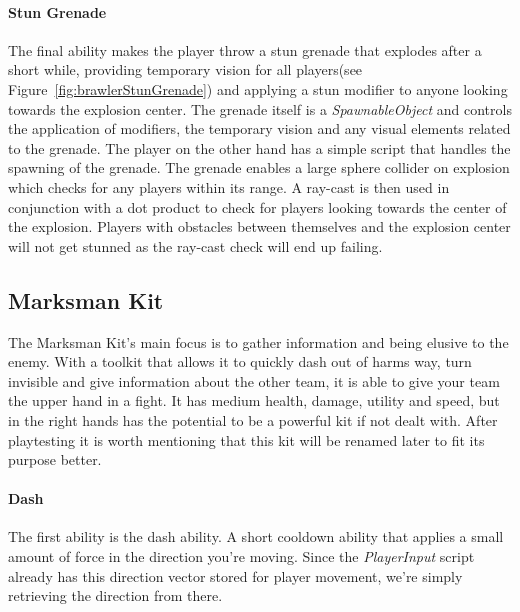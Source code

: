 \paragraph{Stun Grenade}
The final ability makes the player throw a stun grenade that explodes after a short while, providing temporary vision for all players(see Figure~\ref{fig:brawlerStunGrenade}) and applying a stun modifier to anyone looking towards the explosion center. The grenade itself is a \emph{SpawnableObject} and controls the application of modifiers, the temporary vision and any visual elements related to the grenade. The player on the other hand has a simple script that handles the spawning of the grenade. The grenade enables a large sphere collider on explosion which checks for any players within its range. A ray-cast is then used in conjunction with a dot product to check for players looking towards the center of the explosion. Players with obstacles between themselves and the explosion center will not get stunned as the ray-cast check will end up failing. 

\subsection{Marksman Kit}
The Marksman Kit's main focus is to gather information and being elusive to the enemy. With a toolkit that allows it to quickly dash out of harms way, turn invisible and give information about the other team, it is able to give your team the upper hand in a fight. It has medium health, damage, utility and speed, but in the right hands has the potential to be a powerful kit if not dealt with. After playtesting it is worth mentioning that this kit will be renamed later to fit its purpose better.

\paragraph{Dash}
The first ability is the dash ability. A short cooldown ability that applies a small amount of force in the direction you're moving. Since the \emph{PlayerInput} script already has this direction vector stored for player movement, we're simply retrieving the direction from there.

